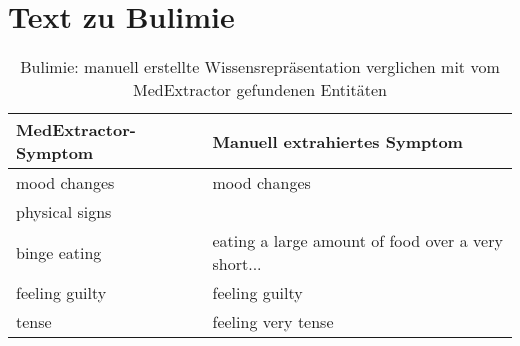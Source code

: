 \section{Text zu Bulimie}
\label{sec:bulimia} 

\begin{table}[H]
\begin{center}
\begin{tabular}{ll}
\toprule
  MedExtractor-Symptom &                       Manuell extrahiertes Symptom \\
\midrule
        mood changes &                                       mood changes \\
      physical signs &                                                    \\
        binge eating & eating a large amount of food over a very short... \\
      feeling guilty &                                     feeling guilty \\
               tense &                                 feeling very tense \\
\bottomrule
\end{tabular}
\caption{Bulimie: manuell erstellte Wissensrepräsentation verglichen mit vom MedExtractor gefundenen Entitäten}
\label{tab:bulimia_vergleich_manuell_medextractor}
\end{center}
\end{table}


